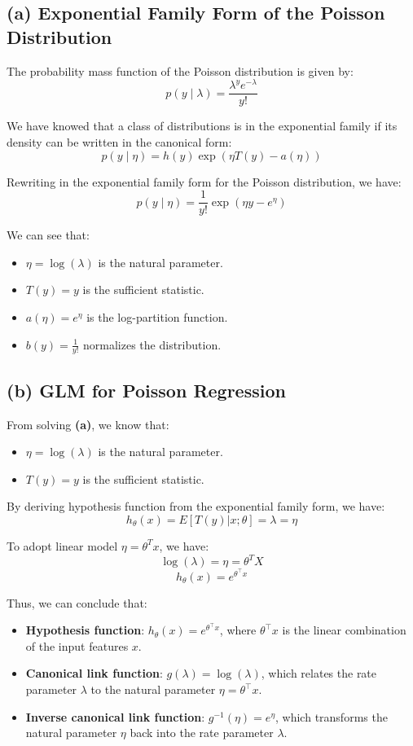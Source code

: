 \documentclass[12pt]{article}
\begin{document}
\subsection*{(a) Exponential Family Form of the Poisson Distribution}

The probability mass function of the Poisson distribution is given by:
\[
    p(y \mid \lambda) = \frac{\lambda^y e^{-\lambda}}{y!}
\]

We have knowed that a class of distributions is in the exponential family if its density can be
written in the canonical form:
\[
    p(y \mid \eta) = h(y) \exp\left( \eta T(y) - a(\eta) \right)
\]

Rewriting in the exponential family form for the Poisson distribution, we have:
\[
    p(y \mid \eta) = \frac{1}{y!} \exp\left( \eta y - e^{\eta} \right)
\]

We can see that:

\begin{itemize}
    \item \( \eta = \log(\lambda) \) is the natural parameter.
    \item \( T(y) = y \) is the sufficient statistic.
    \item \( a(\eta) = e^{\eta} \) is the log-partition function.
    \item \( b(y) = \frac{1}{y!} \) normalizes the distribution.
\end{itemize}

\subsection*{(b) GLM for Poisson Regression}
From solving \textbf{(a)}, we know that:  

\begin{itemize}
    \item \( \eta = \log(\lambda) \) is the natural parameter.
    \item \( T(y) = y \) is the sufficient statistic.
\end{itemize}

By deriving hypothesis function from the exponential family form, we have:
\[
    h_\theta(x) = E[T(y)|x; \theta]= \lambda = \eta
\]

To adopt linear model \(\eta = \theta^T x\), we have:
\[
    \log (\lambda) = \eta = \theta^T X
\]
\[
    h_\theta(x) = e^{\theta^\top x}
\]

Thus, we can conclude that:
\begin{itemize}
    \item \textbf{Hypothesis function}: \( h_\theta(x) = e^{\theta^\top x} \), where \( \theta^\top x \) is the linear combination of the input features \( x \).
    \item \textbf{Canonical link function}: \( g(\lambda) = \log(\lambda) \), which relates the rate parameter \( \lambda \) to the natural parameter \( \eta = \theta^\top x \).
    \item \textbf{Inverse canonical link function}: \( g^{-1}(\eta) = e^{\eta} \), which transforms the natural parameter \( \eta \) back into the rate parameter \( \lambda \).
\end{itemize}
\end{document}
